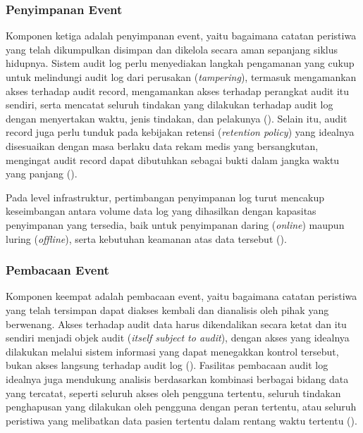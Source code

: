 \subsubsection{Penyimpanan Event}
\label{subsubsec:penyimpanan-event}

Komponen ketiga adalah penyimpanan event, yaitu bagaimana catatan peristiwa yang telah dikumpulkan disimpan dan dikelola secara aman sepanjang siklus hidupnya. Sistem audit log perlu menyediakan langkah pengamanan yang cukup untuk melindungi audit log dari perusakan (\textit{tampering}), termasuk mengamankan akses terhadap audit record, mengamankan akses terhadap perangkat audit itu sendiri, serta mencatat seluruh tindakan yang dilakukan terhadap audit log dengan menyertakan waktu, jenis tindakan, dan pelakunya (\cite{iso27789_2021}). Selain itu, audit record juga perlu tunduk pada kebijakan retensi (\textit{retention policy}) yang idealnya disesuaikan dengan masa berlaku data rekam medis yang bersangkutan, mengingat audit record dapat dibutuhkan sebagai bukti dalam jangka waktu yang panjang (\cite{iso27789_2021}).

Pada level infrastruktur, pertimbangan penyimpanan log turut mencakup keseimbangan antara volume data log yang dihasilkan dengan kapasitas penyimpanan yang tersedia, baik untuk penyimpanan daring (\textit{online}) maupun luring (\textit{offline}), serta kebutuhan keamanan atas data tersebut (\cite{nist80092}).

\subsubsection{Pembacaan Event}
\label{subsubsec:pembacaan-event}

Komponen keempat adalah pembacaan event, yaitu bagaimana catatan peristiwa yang telah tersimpan dapat diakses kembali dan dianalisis oleh pihak yang berwenang. Akses terhadap audit data harus dikendalikan secara ketat dan itu sendiri menjadi objek audit (\textit{itself subject to audit}), dengan akses yang idealnya dilakukan melalui sistem informasi yang dapat menegakkan kontrol tersebut, bukan akses langsung terhadap audit log (\cite{iso27789_2021}). Fasilitas pembacaan audit log idealnya juga mendukung analisis berdasarkan kombinasi berbagai bidang data yang tercatat, seperti seluruh akses oleh pengguna tertentu, seluruh tindakan penghapusan yang dilakukan oleh pengguna dengan peran tertentu, atau seluruh peristiwa yang melibatkan data pasien tertentu dalam rentang waktu tertentu (\cite{iso27789_2021}).

